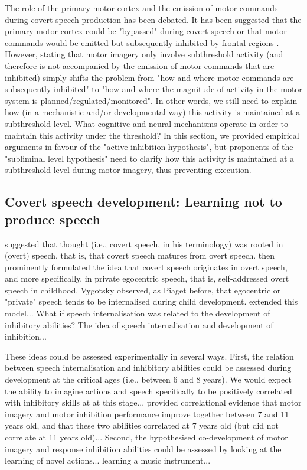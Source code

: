 \documentclass[utf8]{template/frontiersSCNS} %
\begin{document}
The role of the primary motor cortex and the emission of motor commands during covert speech production has been debated. It has been suggested that the primary motor cortex could be "bypassed" during covert speech  \citep[e.g.,][]{tian_mental_2012, tian_effect_2013, tian_mental_2016} or that motor commands would be emitted but subsequently inhibited by frontal regions \citep[e.g.,][]{loevenbruck_cognitive_2018}. However, stating that motor imagery only involve subthreshold activity (and therefore is not accompanied by the emission of motor commands that are inhibited) simply shifts the problem from "how and where motor commands are subsequently inhibited" to "how and where the magnitude of activity in the motor system is planned/regulated/monitored". In other words, we still need to explain how (in a mechanistic and/or developmental way) this activity is maintained at a subthreshold level. What cognitive and neural mechanisms operate in order to maintain this activity under the threshold? In this section, we provided empirical arguments in favour of the "active inhibition hypothesis", but proponents of the "subliminal level hypothesis" need to clarify how this activity is maintained at a subthreshold level during motor imagery, thus preventing execution.

\subsection{Covert speech development: Learning not to produce speech}

\cite{watson_psychology_1919} suggested that thought (i.e., covert speech, in his terminology) was rooted in (overt) speech, that is, that covert speech matures from overt speech. \cite{vygotsky_thought_1934} then prominently formulated the idea that covert speech originates in overt speech, and more specifically, in private egocentric speech, that is, self-addressed overt speech in childhood. Vygotsky observed, as Piaget before, that egocentric or "private" speech tends to be internalised during child development. \cite{fernyhough_alien_2004} extended this model... What if speech internalisation was related to the development of inhibitory abilities? The idea of speech internalisation and development of inhibition...

These ideas could be assessed experimentally in several ways. First, the relation between speech internalisation and inhibitory abilities could be assessed during development at the critical ages (i.e., between 6 and 8 years). We would expect the ability to imagine actions and speech specifically to be positively correlated with inhibitory skills at at this stage...  \cite{wang_relationship_2021} provided correlational evidence that motor imagery and motor inhibition performance improve together between 7 and 11 years old, and that these two abilities correlated at 7 years old (but did not correlate at 11 years old)... Second, the hypothesised co-development of motor imagery and response inhibition abilities could be assessed by looking at the learning of novel actions... learning a music instrument...
\end{document}

